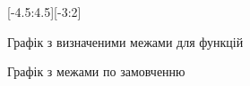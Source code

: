 \documentclass[a4paper]{article}
\begin{document}
    \begin{figure}[!h]\centering
        [-4.5:4.5][-3:2]
        \caption{Графік з визначеними межами для функцій}
        \label{graph:1}
    \end{figure}

    \begin{figure}[!h]\centering
        \caption{Графік з межами по замовченню}
        \label{graph:2}
    \end{figure}
\end{document}
